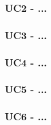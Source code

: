 \subsubsection{UC2 - ...}\label{UC2}

\subsubsection{UC3 - ...}\label{UC3}

\subsubsection{UC4 - ...}\label{UC4}

\subsubsection{UC5 - ...}\label{UC5}

\subsubsection{UC6 - ...}\label{UC6}